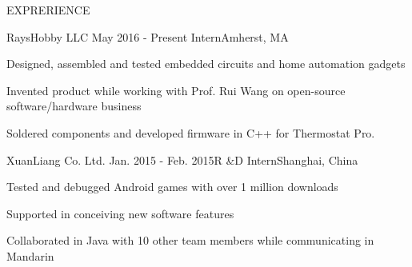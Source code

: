 \documentclass{resume} %
\begin{document}
	\begin{rSection}{EXPRERIENCE}
			
		\begin{rSubsection}{RaysHobby LLC} {May 2016 -  Present}{ Intern}{Amherst, MA}
			\item Designed, assembled and tested embedded circuits and home automation gadgets
			\item Invented product while working with Prof. Rui Wang on open-source software/hardware business
			\item Soldered components and developed firmware in C++ for Thermostat Pro.
		\end{rSubsection}
	
		\begin{rSubsection}{XuanLiang Co. Ltd.} {Jan. 2015 -  Feb. 2015}{R \&D  Intern}{Shanghai, China}
			\item Tested and debugged Android games with over 1 million downloads
			\item Supported in conceiving new software features
			\item Collaborated in Java with 10 other team members while communicating in Mandarin
		\end{rSubsection}
	
	\end{rSection}
	
	
\end{document}
